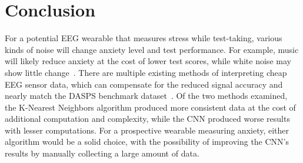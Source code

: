 \documentclass[journal]{IEEEtran}
\begin{document}
\section{Conclusion}
For a potential EEG wearable that measures stress while test-taking, various kinds of noise will change anxiety level and test performance. For example, music will likely reduce anxiety at the cost of lower test scores, while white noise may show little change~\cite{ShahrokhiShabnam2022Teow}. There are multiple existing methods of interpreting cheap EEG sensor data, which can compensate for the reduced signal accuracy and nearly match the DASPS benchmark dataset~\cite{ChatterjeeDebatri2023Doms, GhonchiHamidreza2025MMCA}. Of the two methods examined, the K-Nearest Neighbors algorithm produced more consistent data at the cost of additional computation and complexity, while the CNN produced worse results with lesser computations. For a prospective wearable measuring anxiety, either algorithm would be a solid choice, with the possibility of improving the CNN's results by manually collecting a large amount of data.



\end{document}
